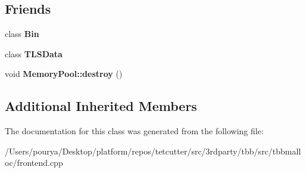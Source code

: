 \subsection*{Friends}
\begin{DoxyCompactItemize}
\item 
\hypertarget{classrml_1_1internal_1_1Block_a6a6bc571688594aded1969d70ba65cce}{}class {\bfseries Bin}\label{classrml_1_1internal_1_1Block_a6a6bc571688594aded1969d70ba65cce}

\item 
\hypertarget{classrml_1_1internal_1_1Block_ae3aa039820cf39eb9faa6a8e37ad5402}{}class {\bfseries T\+L\+S\+Data}\label{classrml_1_1internal_1_1Block_ae3aa039820cf39eb9faa6a8e37ad5402}

\item 
\hypertarget{classrml_1_1internal_1_1Block_a754fcec964f6dc80aeb5d486ef88f60e}{}void {\bfseries Memory\+Pool\+::destroy} ()\label{classrml_1_1internal_1_1Block_a754fcec964f6dc80aeb5d486ef88f60e}

\end{DoxyCompactItemize}
\subsection*{Additional Inherited Members}


The documentation for this class was generated from the following file\+:\begin{DoxyCompactItemize}
\item 
/\+Users/pourya/\+Desktop/platform/repos/tetcutter/src/3rdparty/tbb/src/tbbmalloc/frontend.\+cpp\end{DoxyCompactItemize}
